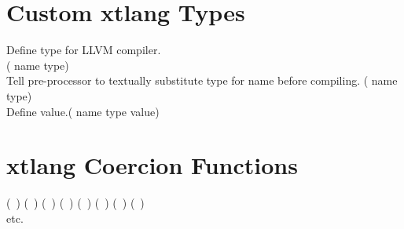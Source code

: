 \documentclass[10pt, twoside]{article}   	%
\begin{document}
\begin{multicols}{3}
\section*{Custom xtlang Types}
Define type for LLVM compiler. \\
\null\hfill ( name type) \\
Tell pre-processor to textually substitute type for name before compiling. \hfill ( name type) \\
Define value.\hfill ( name type value)

\section*{xtlang Coercion Functions}
\begin{multicols}{3}
(~)
(~)
(~)
(~)
(~)
(~)
(~)
(~) \\
etc.
\end{multicols}



\end{multicols}
\end{document}
